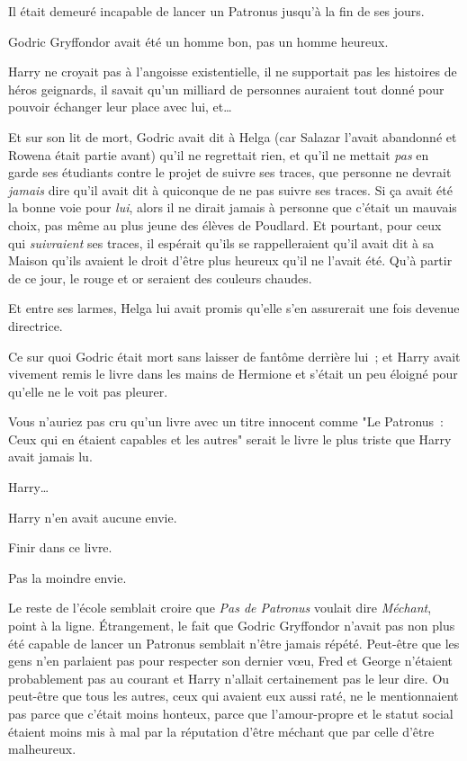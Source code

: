 Il était demeuré incapable de lancer un Patronus jusqu'à la fin de ses jours.

Godric Gryffondor avait été un homme bon, pas un homme heureux.

Harry ne croyait pas à l'angoisse existentielle, il ne supportait pas les histoires de héros geignards, il savait qu'un milliard de personnes auraient tout donné pour pouvoir échanger leur place avec lui, et…

Et sur son lit de mort, Godric avait dit à Helga (car Salazar l'avait abandonné et Rowena était partie avant) qu'il ne regrettait rien, et qu'il ne mettait \emph{pas} en garde ses étudiants contre le projet de suivre ses traces, que personne ne devrait \emph{jamais} dire qu'il avait dit à quiconque de ne pas suivre ses traces. Si ça avait été la bonne voie pour \emph{lui}, alors il ne dirait jamais à personne que c'était un mauvais choix, pas même au plus jeune des élèves de Poudlard. Et pourtant, pour ceux qui \emph{suivraient} ses traces, il espérait qu'ils se rappelleraient qu'il avait dit à sa Maison qu'ils avaient le droit d'être plus heureux qu'il ne l'avait été. Qu'à partir de ce jour, le rouge et or seraient des couleurs chaudes.

Et entre ses larmes, Helga lui avait promis qu'elle s'en assurerait une fois devenue directrice.

Ce sur quoi Godric était mort sans laisser de fantôme derrière lui~; et Harry avait vivement remis le livre dans les mains de Hermione et s'était un peu éloigné pour qu'elle ne le voit pas pleurer.

Vous n'auriez pas cru qu'un livre avec un titre innocent comme "Le Patronus~: Ceux qui en étaient capables et les autres" serait le livre le plus triste que Harry avait jamais lu.

Harry…

Harry n'en avait aucune envie.

Finir dans ce livre.

Pas la moindre envie.

Le reste de l'école semblait croire que \emph{Pas de Patronus} voulait dire \emph{Méchant}, point à la ligne. Étrangement, le fait que Godric Gryffondor n'avait pas non plus été capable de lancer un Patronus semblait n'être jamais répété. Peut-être que les gens n'en parlaient pas pour respecter son dernier vœu, Fred et George n'étaient probablement pas au courant et Harry n'allait certainement pas le leur dire. Ou peut-être que tous les autres, ceux qui avaient eux aussi raté, ne le mentionnaient pas parce que c'était moins honteux, parce que l'amour-propre et le statut social étaient moins mis à mal par la réputation d'être méchant que par celle d'être malheureux.


